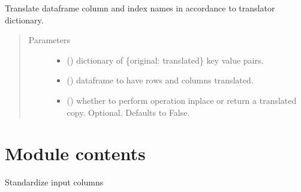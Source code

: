 \documentclass[letterpaper,10pt,english]{sphinxmanual}
\begin{document}
\begin{fulllineitems}
\label{\detokenize{dalio.util:dalio.util.translation_utils.translate_df}}
Translate dataframe column and index names in accordance to translator
dictionary.
\begin{quote}\begin{description}
\item[{Parameters}] \leavevmode\begin{itemize}
\item {} 
 () \textendash{} dictionary of \{original: translated\} key value
pairs.

\item {} 
 () \textendash{} dataframe to have rows and columns translated.

\item {} 
 () \textendash{} whether to perform operation inplace or return a
translated copy. Optional. Defaults to False.

\end{itemize}

\end{description}\end{quote}

\end{fulllineitems}



\section{Module contents}
\label{\detokenize{dalio.util:module-dalio.util}}\label{\detokenize{dalio.util:module-contents}}

\begin{fulllineitems}
\label{\detokenize{dalio.util:dalio.util.process_cols}}
Standardize input columns

\end{fulllineitems}
\end{document}
